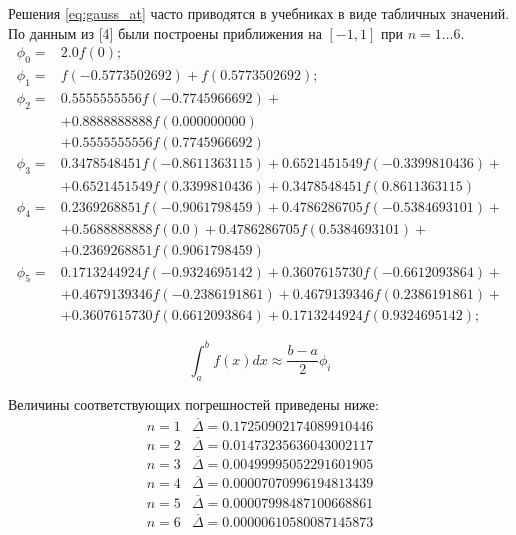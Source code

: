 \documentclass[a4paper, fontsize=14pt]{article}
\begin{document}
    Решения \eqref{eq:gauss_at} часто приводятся в учебниках в виде табличных значений. По данным из [4] были построены приближения на $[-1, 1]$ при $n = 1 \dots 6$. 
    \begin{equation*}
        \begin{aligned}
            \phi_0 =& 2.0 f(0); \\
            \phi_1 =& f(-0.5773502692) +  f(0.5773502692); \\
            \phi_2 =& 0.5555555556 f(-0.7745966692) +\\
            & + 0.8888888888 f( 0.000000000) \\
                   &+ 0.5555555556  f(0.7745966692) \\
            \phi_3 =& 0.3478548451 f(-0.8611363115) + 0.6521451549 f(-0.3399810436) +\\
                   &+ 0.6521451549  f( 0.3399810436) + 0.3478548451  f(0.8611363115)\\
            \phi_4 =& 0.2369268851 f(-0.9061798459) + 0.4786286705 f(-0.5384693101)+ \\
                   &+ 0.5688888888  f( 0.0) + 0.4786286705  f( 0.5384693101)+ \\
                   &+0.2369268851  f(0.9061798459)\\
            \phi_5 =& 0.1713244924 f(-0.9324695142)+ 0.3607615730  f(-0.6612093864)+ \\
            & +0.4679139346  f(-0.2386191861)+ 0.4679139346  f( 0.2386191861)+\\
            &+ 0.3607615730 f( 0.6612093864)+ 0.1713244924  f( 0.9324695142);
        \end{aligned}
    \end{equation*}

    $$\int_a^b f(x) dx \approx  \frac{b - a}{2} \phi_i$$

    Величины соответствующих погрешностей приведены ниже:
        \begin{equation*}
            \begin{matrix*}
                n = 1 &\overline{\Delta} = 0.17250902174089910446\\
                n = 2 &\overline{\Delta} = 0.01473235636043002117\\
                n = 3 &\overline{\Delta} = 0.00499995052291601905\\
                n = 4 &\overline{\Delta} = 0.00007070996194813439\\
                n = 5 &\overline{\Delta} = 0.00007998487100668861\\
                n = 6 &\overline{\Delta} = 0.00000610580087145873\\
            \end{matrix*}
        \end{equation*}
\end{document}

